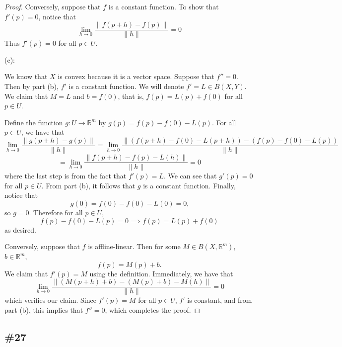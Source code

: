 \documentclass{article}
\theoremstyle{plain} %
\numberwithin{thm}{section} %
\theoremstyle{definition}
\begin{document}
\begin{proof}
            Conversely, suppose that \(f\) is a constant function. To show that \(f'(p) = 0\), notice that
            \[
                \lim_{h \to 0} \frac{\|f(p + h) - f(p)\|}{\|h\|} = 0
            \]
            Thus \(f'(p) = 0\) for all \(p \in U\).

            (c):

            We know that \(X\) is convex because it is a vector space. Suppose that \(f'' = 0\). Then by part (b), \(f'\) is a constant function. We will denote \(f' = L \in B(X,Y)\). We claim that \(M = L\) and \(b = f(0)\), that is, \(f(p) = L(p) + f(0)\) for all \(p \in U\).

            Define the function \(g: U \to \mathbb{R}^m\) by \(g(p) = f(p) - f(0) - L(p)\). For all \(p \in U\), we have that
            \[
                \lim_{h \to 0} \frac{\|g(p + h) - g(p)\|}{\|h\|} = \lim_{h \to 0} \frac{\|(f(p+h) - f(0) - L(p+h)) - (f(p) - f(0) - L(p))}{\|h\|}
            \]
            \[
                = \lim_{h \to 0} \frac{\|f(p+h) - f(p) - L(h)\|}{\|h\|} = 0
            \]
            where the last step is from the fact that \(f'(p) = L\). We can see that \(g'(p) = 0\) for all \(p \in U\). From part (b), it follows that \(g\) is a constant function. Finally, notice that
            \[
                g(0) = f(0) - f(0) - L(0) = 0 \text{,} 
            \]
            so \(g = 0\). Therefore for all \(p \in U\),
            \[
                f(p) - f(0) - L(p) = 0 \implies f(p) = L(p) + f(0)
            \]
            as desired.

            Conversely, suppose that \(f\) is affline-linear. Then for some \(M \in B(X, \mathbb{R}^m)\), \(b \in \mathbb{R}^m\),
            \[
                f(p) = M(p) + b \text{.} 
            \]
            We claim that \(f'(p) = M\) using the definition. Immediately, we have that
            \[
                \lim_{h \to 0} \frac{\|(M(p+h) + b) - (M(p) + b) - M(h)\|}{\|h\|} = 0
            \]
            which verifies our claim. Since \(f'(p) = M\) for all \(p \in U\), \(f'\) is constant, and from part (b), this implies that \(f'' = 0\), which completes the proof.
        \end{proof}

        \subsection{\#27}
\end{document}
